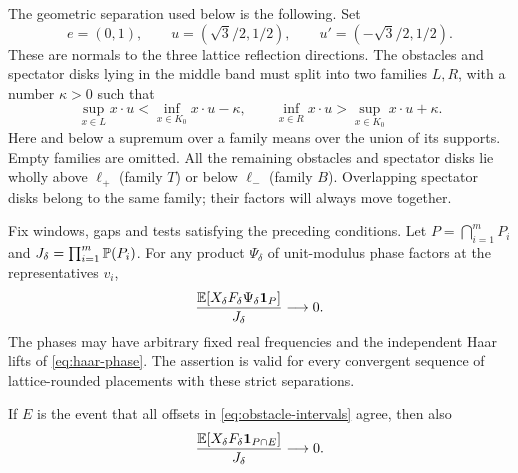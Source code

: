 The geometric separation used below is the following.  Set
\begin{equation}\label{eq:three-normals}
 e=(0,1),\qquad u=(\sqrt3/2,1/2),\qquad
 u'=(-\sqrt3/2,1/2).
\end{equation}
These are normals to the three lattice reflection directions.
The obstacles and spectator disks lying in the middle band must
split into two families $L,R$, with a number $\kappa>0$ such that
\begin{equation}\label{eq:middle-projections}
 \sup_{x\in L}x\cdot u
    <\inf_{x\in K_0}x\cdot u-\kappa,
 \qquad
 \inf_{x\in R}x\cdot u
    >\sup_{x\in K_0}x\cdot u+\kappa.
\end{equation}
Here and below a supremum over a family means over the union of
its supports.  Empty families are omitted.  All the remaining
obstacles and spectator disks lie wholly above $\ell_+$ (family
$T$) or below $\ell_-$ (family $B$).  Overlapping spectator disks
belong to the same family; their factors will always move together.

\begin{proposition}\label{prop:gapped-identity}
Fix windows, gaps and tests satisfying the preceding conditions.
Let $P=\bigcap_{i=1}^mP_i$ and
$J_\delta=\prod_{i=1}^m\mathbb P(P_i)$.  For any product $\Psi_\delta$
of unit-modulus phase factors at the representatives $v_i$,
\begin{equation}\label{eq:gapped-phase-identity}
 \frac{\mathbb E[X_\delta F_\delta\Psi_\delta\mathbf 1_P]}{J_\delta}
       \longrightarrow0.
\end{equation}
The phases may have arbitrary fixed real frequencies and the
independent Haar lifts of \eqref{eq:haar-phase}.  The assertion is
valid for every convergent sequence of lattice-rounded placements
with these strict separations.

If $E$ is the event that all offsets in
\eqref{eq:obstacle-intervals} agree, then also
\begin{equation}\label{eq:gapped-equal-offset-identity}
 \frac{\mathbb E[X_\delta F_\delta\mathbf 1_{P\cap E}]}{J_\delta}
       \longrightarrow0.
\end{equation}
\end{proposition}

